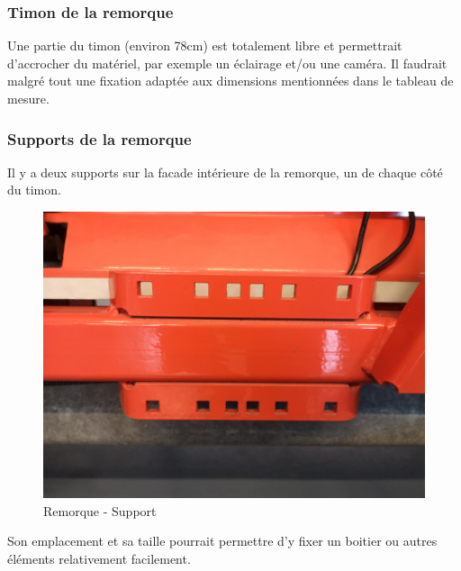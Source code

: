 \subsubsection{Timon de la remorque}
Une partie du timon (environ 78cm) est totalement libre et permettrait d'accrocher du matériel, par exemple un éclairage et/ou une caméra.
Il faudrait malgré tout une fixation adaptée aux dimensions mentionnées dans le tableau de mesure.
\subsubsection{Supports de la remorque}
Il y a deux supports sur la facade intérieure de la remorque, un de chaque côté du timon.
\begin{figure}[H]
    \centering
    \includegraphics[width=13cm]{assets/figures/support.jpg}
    \caption{Remorque - Support}
\end{figure}

Son emplacement et sa taille pourrait permettre d'y fixer un boitier ou autres éléments relativement facilement.